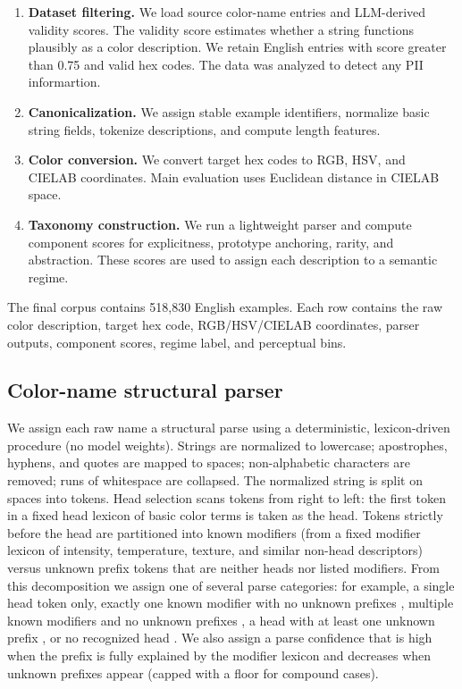 \documentclass[11pt]{article}
\begin{document}
\begin{enumerate}
    \item \textbf{Dataset filtering.} We load source color-name entries and
    LLM-derived validity scores. The validity score estimates whether a
    string functions plausibly as a color description. We retain English
    entries with score greater than 0.75 and valid hex codes. The data was analyzed to detect any PII informartion.
    \item \textbf{Canonicalization.} We assign stable example identifiers,
    normalize basic string fields, tokenize descriptions, and compute length
    features.
    \item \textbf{Color conversion.} We convert target hex codes to RGB,
    HSV, and CIELAB coordinates. Main evaluation uses Euclidean distance in
    CIELAB space.
    \item \textbf{Taxonomy construction.} We run a lightweight parser and
    compute component scores for explicitness, prototype anchoring, rarity,
    and abstraction. These scores are used to assign each description to a
    semantic regime.
\end{enumerate}

The final corpus contains 518{,}830 English examples. Each row contains the
raw color description, target hex code, RGB/HSV/CIELAB coordinates, parser
outputs, component scores, regime label, and perceptual bins.

\subsection{Color-name structural parser}
\label{ap:parser}


We assign each raw name a structural parse using a deterministic, lexicon-driven procedure (no model weights). Strings are normalized to lowercase; apostrophes, hyphens, and quotes are mapped to spaces; non-alphabetic characters are removed; runs of whitespace are collapsed. The normalized string is split on spaces into tokens. Head selection scans tokens from right to left: the first token in a fixed head lexicon of basic color terms is taken as the head. Tokens strictly before the head are partitioned into known modifiers (from a fixed modifier lexicon of intensity, temperature, texture, and similar non-head descriptors) versus unknown prefix tokens that are neither heads nor listed modifiers. From this decomposition we assign one of several parse categories: for example, a single head token only, exactly one known modifier with no unknown prefixes , multiple known modifiers and no unknown prefixes , a head with at least one unknown prefix , or no recognized head . We also assign a parse confidence that is high when the prefix is fully explained by the modifier lexicon and decreases when unknown prefixes appear (capped with a floor for compound cases).
\end{document}
